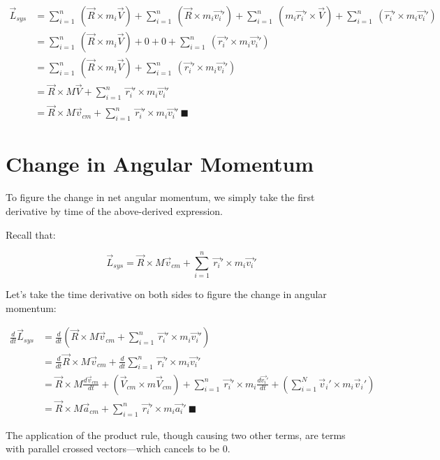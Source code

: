 \documentclass[letterpaper]{article}
\begin{document}
\begin{align}
 \vec{L}_{sys} &= \sum_{i=1}^n\ (\vec{R} \times m_i\vec{V}) +\sum_{i=1}^n\  (\vec{R} \times m_i\vec{v_i}') +\sum_{i=1}^n\  (m_i\vec{r_i}' \times \vec{V}) +\sum_{i=1}^n\  (\vec{r_i}' \times m_i\vec{v_i}')\\
&= \sum_{i=1}^n\ (\vec{R} \times m_i\vec{V}) +0 +0 +\sum_{i=1}^n\  (\vec{r_i}' \times m_i\vec{v_i}')\\
&= \sum_{i=1}^n\ (\vec{R} \times m_i\vec{V}) +\sum_{i=1}^n\  (\vec{r_i}' \times m_i\vec{v_i}')\\
&= \vec{R} \times M\vec{V} + \sum_{i=1}^n\  \vec{r_i}' \times m_i\vec{v_i}'\\ 
&= \vec{R} \times M\vec{v}_{cm} + \sum_{i=1}^n\  \vec{r_i}' \times m_i\vec{v_i}'\ \blacksquare
\end{align}

\section{Change in Angular Momentum}
\label{sec:org8953b12}
To figure the change in net angular momentum, we simply take the first derivative by time of the above-derived expression.

Recall that:

\begin{equation}
  \vec{L}_{sys} =\vec{R} \times M\vec{v}_{cm} + \sum_{i=1}^n\  \vec{r_i}' \times m_i\vec{v_i}'
\end{equation}

Let's take the time derivative on both sides to figure the change in angular momentum:

\begin{align}
   \frac{d}{dt} \vec{L}_{sys} &=\frac{d}{dt} \left(\vec{R} \times M\vec{v}_{cm} + \sum_{i=1}^n\  \vec{r_i}' \times m_i\vec{v_i}' \right) \\
&= \frac{d}{dt} \vec{R} \times M\vec{v}_{cm} + \frac{d}{dt} \sum_{i=1}^n\  \vec{r_i}' \times m_i\vec{v_i}'  \\
&= \vec{R} \times M\frac{d\vec{v}_{cm}}{dt}  + \left(\vec{V}_{cm} \times m \vec{V}_{cm}\right)+ \sum_{i=1}^n\  \vec{r_i}' \times m_i\frac{d\vec{v_i}'}{dt} + \left(\sum_{i=1}^N \vec{v}_i' \times m_i \vec{v}_i'\right)  \\
&= \vec{R} \times M\vec{a}_{cm}  + \sum_{i=1}^n\  \vec{r_i}' \times m_i \vec{a_i}'\ \blacksquare
\end{align}

The application of the product rule, though causing two other terms, are terms with parallel crossed vectors---which cancels to be \(0\).
\end{document}
